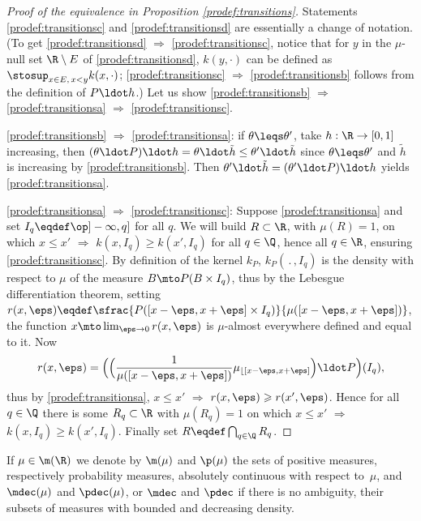 \begin{proof}[Proof of the equivalence in Proposition \ref{prodef:transitions}]
Statements \eqref{prodef:transitionsc} and \eqref{prodef:transitionsd} are essentially a change of notation. (To get \eqref{prodef:transitionsd} $\Rightarrow$ \eqref{prodef:transitionsc}, notice that for $y$ in the $\mu$-null set $\R\setminus E$ of \eqref{prodef:transitionsd}, $k(y,\cdot)$ can be defined as $\stosup_{x\in E,\,x<y} k(x,\cdot)$; \eqref{prodef:transitionsc} $\!\Rightarrow\!$ \eqref{prodef:transitionsb} follows from the definition of $P\ldot h$.) Let us show \eqref{prodef:transitionsb} $\Rightarrow$ \eqref{prodef:transitionsa} $\Rightarrow$ \eqref{prodef:transitionsc}.

\eqref{prodef:transitionsb} $\Rightarrow$ \eqref{prodef:transitionsa}: if $\theta\leqs \theta'$, take $h:\R\to[0,1]$ increasing, then $(\theta \ldot P)\ldot h= \theta \ldot\tilde h\leq \theta' \ldot\tilde h$ since $\theta\leqs \theta'$ and $\tilde h$ is increasing by \eqref{prodef:transitionsb}. Then $\theta'\ldot\tilde h=(\theta'\ldot P)\ldot h$ yields \eqref{prodef:transitionsa}.

\eqref{prodef:transitionsa} $\Rightarrow$ \eqref{prodef:transitionsc}: Suppose \eqref{prodef:transitionsa} and set $I_q\eqdef\op]-\infty,q]$ for all $q$. We will build $R\subset\R$, with $\mu(R)=1$, on which $x\leqslant x'$ $\Rightarrow$ $k(x,I_q)\geqslant k(x',I_q)$ for all $q\in\Q$, hence all $q\in\R$, ensuring \eqref{prodef:transitionsc}. By definition of the kernel $k_P$, $k_P(\,.\,,I_q)$ is the density with respect to $\mu$ of the measure $B\mto P(B\times I_q)$, thus by the Lebesgue differentiation theorem, setting $r(x,\eps)\eqdef\sfrac{P([x-\eps,x+\eps]\times I_q)}{\mu([x-\eps,x+\eps])}$, the function $x\mto\lim_{\eps\to0}r(x,\eps)$ is $\mu$-almost everywhere defined and equal to it. Now
\[
r(x,\eps)=\Bigl(\Bigl(\frac1{\mu([x-\eps,x+\eps])}\mu_{\lfloor[x-\eps,x+\eps]}\Bigr)\ldot P\Bigr)(I_q),
\]
thus by \eqref{prodef:transitionsa}, $x\leqslant x'$ $\Rightarrow$ $r(x,\eps)\geqslant r(x',\eps)$. Hence for all $q\in\Q$ there is some $R_q\subset \R$ with $\mu(R_q)=1$ on which $x\leqslant x'$ $\Rightarrow$ $k(x,I_q)\geqslant k(x',I_q)$. Finally set $R\eqdef\bigcap_{q\in\Q} R_q$.
\end{proof}

\begin{notation}\label{notation:mdec}
If $\mu\in\m(\R)$ we denote by $\m(\mu)$ and $\p(\mu)$ the sets of positive measures, respectively probability measures, absolutely continuous with respect to~$\mu$, and $\mdec(\mu)$ and $\pdec(\mu)$, or $\mdec$ and $\pdec$ if there is no ambiguity, their subsets of measures with bounded and decreasing density.
\end{notation}

